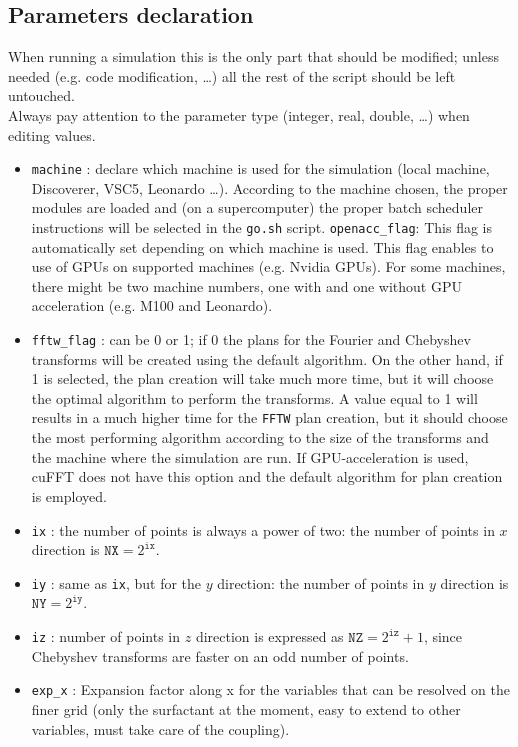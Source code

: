 \subsection{Parameters declaration}
When running a simulation this is the only part that should be modified; unless needed (e.g. code modification, \dots) all the rest of the script should be left untouched.\\
Always pay attention to the parameter type (integer, real, double, \dots) when editing values.
\begin{itemize}
\item \texttt{machine} : declare which machine is used for the simulation (local machine, Discoverer, VSC5, Leonardo \dots). According to the machine chosen, the proper modules are loaded and (on a supercomputer) the proper batch scheduler instructions will be selected in the \texttt{go.sh} script.
\texttt{openacc\_flag}: This flag is automatically set depending on which machine is used. 
This flag enables to use of GPUs on supported machines (e.g. Nvidia GPUs). 
For some machines, there might be two machine numbers, one with and one without GPU acceleration (e.g. M100 and Leonardo).
\item \texttt{fftw\_flag} : can be 0 or 1; if 0 the plans for the Fourier and Chebyshev transforms will be created using the default algorithm. 
On the other hand, if 1 is selected, the plan creation will take much more time, but it will choose the optimal algorithm to perform the transforms. 
A value equal to 1 will results in a much higher time for the \texttt{FFTW} plan creation, but it should choose the most performing algorithm according to the size of the transforms and the machine where the simulation are run.
If GPU-acceleration is used, cuFFT does not have this option and the default algorithm for plan creation is employed.
\item \texttt{ix} : the number of points is always a power of two: the number of points in $x$ direction is $\texttt{NX}=2^\texttt{ix}$.
\item \texttt{iy} : same as \texttt{ix}, but for the $y$ direction: the number of points in $y$ direction is $\texttt{NY}=2^\texttt{iy}$.
\item \texttt{iz} : number of points in $z$ direction is expressed as $\texttt{NZ}=2^\texttt{iz}+1$, since Chebyshev transforms are faster on an odd number of points.
\item \texttt{exp\_x} : Expansion factor along x for the variables that can be resolved on the finer grid (only the surfactant at the moment, easy to extend to other variables, must take care of the coupling).

\end{itemize}
